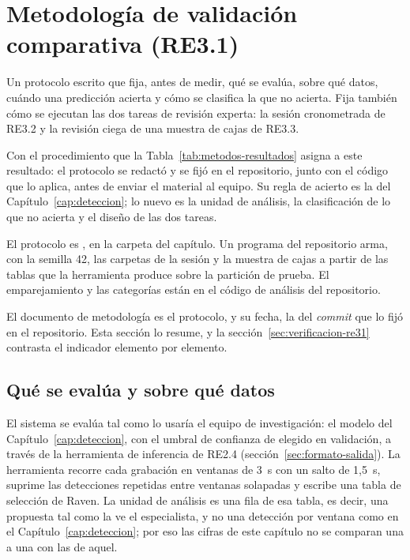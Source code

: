 \section{Metodología de validación comparativa (RE3.1)}
\label{sec:re31}

 Un protocolo escrito que fija, antes de medir, qué se evalúa,
sobre qué datos, cuándo una predicción acierta y cómo se clasifica la que no
acierta. Fija también cómo se ejecutan las dos tareas de revisión experta: la
sesión cronometrada de RE3.2 y la revisión ciega de una muestra de cajas de
RE3.3.

 Con el procedimiento que la
Tabla~\ref{tab:metodos-resultados} asigna a este resultado: el protocolo se
redactó y se fijó en el repositorio, junto con el código que lo aplica, antes de
enviar el material al equipo. Su regla de acierto es la del
Capítulo~\ref{cap:deteccion}; lo nuevo es la unidad de análisis, la clasificación
de lo que no acierta y el diseño de las dos tareas.

 El protocolo es , en la carpeta del
capítulo. Un programa del repositorio arma, con la semilla 42, las carpetas de la
sesión y la muestra de cajas a partir de las tablas que la herramienta produce
sobre la partición de prueba. El emparejamiento y las categorías están en el
código de análisis del repositorio.

 El documento de metodología es el protocolo, y su
fecha, la del \textit{commit} que lo fijó en el repositorio. Esta sección lo
resume, y la sección~\ref{sec:verificacion-re31} contrasta el indicador elemento
por elemento.

\subsection{Qué se evalúa y sobre qué datos}

El sistema se evalúa tal como lo usaría el equipo de investigación: el modelo
\rWinner{} del Capítulo~\ref{cap:deteccion}, con el umbral de confianza de
\rThresholdYol{} elegido en validación, a través de la herramienta de inferencia
de RE2.4 (sección~\ref{sec:formato-salida}). La herramienta recorre cada
grabación en ventanas de 3~s con un salto de 1,5~s, suprime las detecciones
repetidas entre ventanas solapadas y escribe una tabla de selección de Raven. La
unidad de análisis es una fila de esa tabla, es decir, una propuesta tal como la
ve el especialista, y no una detección por ventana como en el
Capítulo~\ref{cap:deteccion}; por eso las cifras de este capítulo no se comparan
una a una con las de aquel.

